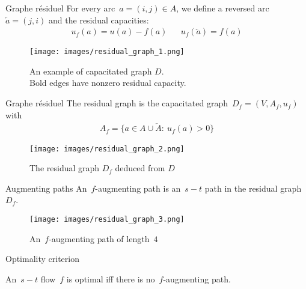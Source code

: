\documentclass{beamer}
\begin{document}
\begin{frame}[t]{Graphe résiduel} \pause
  For every arc~$a = (i, j) \in A$, we define a reversed arc~$\overleftarrow{a} = (j, i)$  \pause and the residual capacities:
  \begin{align*}
    u_f(a) = u(a) - f(a) && u_f\left(\overleftarrow{a}\right) = f(a)
  \end{align*}

  \vfill \pause
  
  \begin{figure}
    \centering
    \texttt{[image: images/residual\_graph\_1.png]}
    \caption{An example of capacitated graph $D$. \\Bold edges have nonzero residual capacity.}
  \end{figure}
\end{frame}

\begin{frame}[t]{Graphe résiduel} \pause
  The residual graph is the capacitated graph~$D_f = (V, A_f, u_f)$ with
  \begin{align*}
    A_f = \{a \in A \cup \overleftarrow{A}:~ u_f(a) > 0\} 
  \end{align*}
  
  \vfill \pause
  
  \begin{figure}
    \centering
    \texttt{[image: images/residual\_graph\_2.png]}
    \caption{The residual graph $D_f$ deduced from $D$}
  \end{figure}
\end{frame}

\begin{frame}[t]{Augmenting paths} \pause
  An~$f$-augmenting path is an~$s-t$ path in the residual graph~$D_f$.
  
  \vfill \pause
  
  \begin{figure}
    \centering
    \texttt{[image: images/residual\_graph\_3.png]}
    \caption{An~$f$-augmenting path of length~$4$}
  \end{figure}
\end{frame}

\begin{frame}[t]{Optimality criterion} \pause
  \begin{theorem}[6.4]
    An~$s-t$ flow~$f$ is optimal iff there is no~$f$-augmenting path. 
  \end{theorem}
\end{frame}
\end{document}
